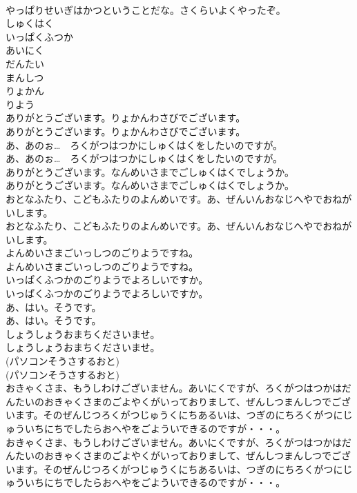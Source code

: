 \documentclass[8pt]{extreport}
\begin{document}
\begin{CJK}{UTF8}{min}
\\	やっぱりせいぎはかつということだな。さくらいよくやったぞ。
\\	しゅくはく
\\	いっぱくふつか
\\	あいにく
\\	だんたい
\\	まんしつ
\\	りょかん
\\	りよう
\\	ありがとうございます。りょかんわさびでございます。
\\	ありがとうございます。りょかんわさびでございます。
\\	あ、あのぉ…　ろくがつはつかにしゅくはくをしたいのですが。
\\	あ、あのぉ…　ろくがつはつかにしゅくはくをしたいのですが。
\\	ありがとうございます。なんめいさまでごしゅくはくでしょうか。
\\	ありがとうございます。なんめいさまでごしゅくはくでしょうか。
\\	おとなふたり、こどもふたりのよんめいです。あ、ぜんいんおなじへやでおねがいします。
\\	おとなふたり、こどもふたりのよんめいです。あ、ぜんいんおなじへやでおねがいします。
\\	よんめいさまごいっしつのごりようですね。
\\	よんめいさまごいっしつのごりようですね。
\\	いっぱくふつかのごりようでよろしいですか。
\\	いっぱくふつかのごりようでよろしいですか。
\\	あ、はい。そうです。
\\	あ、はい。そうです。
\\	しょうしょうおまちくださいませ。
\\	しょうしょうおまちくださいませ。
\\	(パソコンそうさするおと)
\\	(パソコンそうさするおと)
\\	おきゃくさま、もうしわけございません。あいにくですが、ろくがつはつかはだんたいのおきゃくさまのごよやくがいっておりまして、ぜんしつまんしつでございます。そのぜんじつろくがつじゅうくにちあるいは、つぎのにちろくがつにじゅういちにちでしたらおへやをごよういできるのですが・・・。
\\	おきゃくさま、もうしわけございません。あいにくですが、ろくがつはつかはだんたいのおきゃくさまのごよやくがいっておりまして、ぜんしつまんしつでございます。そのぜんじつろくがつじゅうくにちあるいは、つぎのにちろくがつにじゅういちにちでしたらおへやをごよういできるのですが・・・。

\end{CJK}
\end{document}

